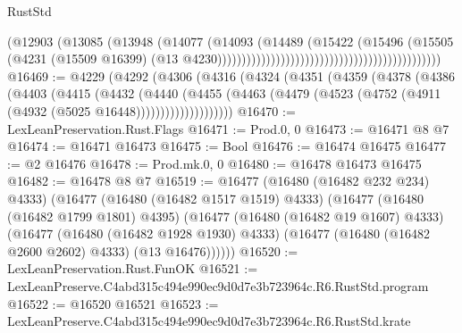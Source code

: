 \begin{lexlean}{RustStd}
\begin{coremodule}
                                                                          (@12903
                                                                            (@13085
                                                                              (@13948
                                                                                (@14077
                                                                                  (@14093
                                                                                    (@14489
                                                                                      (@15422
                                                                                        (@15496
                                                                                          (@15505
                                                                                            (@4231
                                                                                              (@15509
                                                                                                @16399)
                                                                                              (@13
                                                                                                @4230))))))))))))))))))))))))))))))))))))))))))))))
@16469 := @4229
    (@4292
      (@4306
        (@4316
          (@4324
            (@4351
              (@4359
                (@4378
                  (@4386
                    (@4403
                      (@4415
                        (@4432
                          (@4440
                            (@4455
                              (@4463
                                (@4479 (@4523 (@4752 (@4911 (@4932 (@5025 @16448))))))))))))))))))))
@16470 := LexLeanPreservation.Rust.Flags
@16471 := Prod.{0, 0}
@16473 := @16471 @8 @7
@16474 := @16471 @16473
@16475 := Bool
@16476 := @16474 @16475
@16477 := @2 @16476
@16478 := Prod.mk.{0, 0}
@16480 := @16478 @16473 @16475
@16482 := @16478 @8 @7
@16519 := @16477
    (@16480 (@16482 @232 @234) @4333)
    (@16477
      (@16480 (@16482 @1517 @1519) @4333)
      (@16477
        (@16480 (@16482 @1799 @1801) @4395)
        (@16477
          (@16480 (@16482 @19 @1607) @4333)
          (@16477
            (@16480 (@16482 @1928 @1930) @4333)
            (@16477 (@16480 (@16482 @2600 @2602) @4333) (@13 @16476))))))
@16520 := LexLeanPreservation.Rust.FunOK
@16521 := LexLeanPreserve.C4abd315c494e990ec9d0d7e3b723964c.R6.RustStd.program
@16522 := @16520 @16521
@16523 := LexLeanPreserve.C4abd315c494e990ec9d0d7e3b723964c.R6.RustStd.krate

\end{coremodule}
\end{lexlean}
